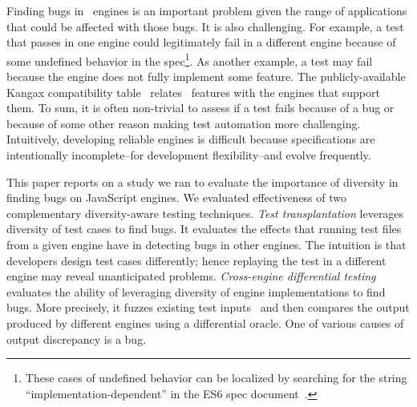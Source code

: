 \documentclass[10pt,conference,anonymous]{IEEEtran}
\begin{document}
Finding bugs in \js\ engines is an important problem given the range
of applications that could be affected with those
bugs. It is also
challenging. For example, a test that passes in one engine could
legitimately fail in a different engine because of some undefined
behavior in the spec\footnote{These cases of undefined behavior can be
  localized by searching for the string ``implementation-dependent''
  in the ES6 spec document~\cite{ecmas262-spec}.}. As another example,
a test may fail because the engine does not fully implement some
feature. The publicly-available Kangax compatibility
table~\cite{kangax} relates \js\ features with the engines that
support them. To sum, it is often non-trivial to assess if a test
fails because of a bug or because of some other reason making test
automation more challenging. Intuitively, developing reliable engines
is difficult because specifications are intentionally incomplete--for
development flexibility--and evolve frequently.

This paper reports on a study we ran to evaluate the importance of
diversity in finding bugs on JavaScript engines. We evaluated
effectiveness of two complementary diversity-aware testing
techniques. \emph{Test transplantation} leverages diversity of test
cases to find bugs. It evaluates the effects that running \js{} test
files from a given engine have in detecting bugs in other engines. The
intuition is that developers design test cases differently; hence
replaying the test in a different engine may reveal unanticipated
problems. \emph{Cross-engine differential testing} evaluates the
ability of leveraging diversity of engine implementations to find
bugs. More precisely, it fuzzes existing test
inputs~\cite{fuzz-testing-history} and then compares the output
produced by different engines using a differential oracle. One of
various causes of output discrepancy is a bug.

\end{document}
